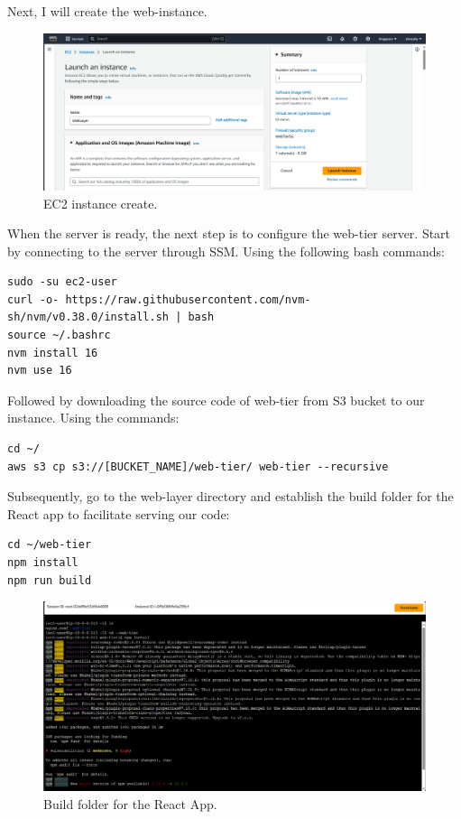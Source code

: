 \documentclass{article}
\begin{document}
Next, I will create the web-instance.\par
\begin{figure}[h]
    \centering
    \includegraphics[width=12cm]{Pictures/Web-tier/EC2_create.png}
    \caption{EC2 instance create.}
    \label{fig:enter-label}
\end{figure}

When the server is ready, the next step is to configure the web-tier server. Start by connecting to the server through SSM. Using the following bash commands:\par

\begin{lstlisting}
sudo -su ec2-user
curl -o- https://raw.githubusercontent.com/nvm-sh/nvm/v0.38.0/install.sh | bash
source ~/.bashrc
nvm install 16
nvm use 16
\end{lstlisting}

Followed by downloading the source code of web-tier from S3 bucket to our instance. Using the commands:\par
\begin{lstlisting}
cd ~/
aws s3 cp s3://[BUCKET_NAME]/web-tier/ web-tier --recursive
\end{lstlisting}

Subsequently, go to the web-layer directory and establish the build folder for the React app to facilitate serving our code:\par
\begin{lstlisting}
cd ~/web-tier
npm install 
npm run build
\end{lstlisting}

\begin{figure}[h]
    \centering
    \includegraphics[width=12cm]{Pictures/Web-tier/npm_build.png}
    \caption{Build folder for the React App.}
    \label{fig:enter-label}
\end{figure}
\end{document}
